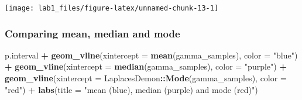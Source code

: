 \documentclass[]{article}
\newenvironment{Shaded}{\begin{snugshade}}{\end{snugshade}}
\newcommand{\KeywordTok}[1]{\textcolor[rgb]{0.13,0.29,0.53}{\textbf{#1}}}
\newcommand{\DataTypeTok}[1]{\textcolor[rgb]{0.13,0.29,0.53}{#1}}
\newcommand{\DecValTok}[1]{\textcolor[rgb]{0.00,0.00,0.81}{#1}}
\newcommand{\FloatTok}[1]{\textcolor[rgb]{0.00,0.00,0.81}{#1}}
\newcommand{\StringTok}[1]{\textcolor[rgb]{0.31,0.60,0.02}{#1}}
\newcommand{\OperatorTok}[1]{\textcolor[rgb]{0.81,0.36,0.00}{\textbf{#1}}}
\newcommand{\NormalTok}[1]{#1}
\begin{document}
\begin{Shaded}
\end{Shaded}

\begin{center}\texttt{[image: lab1\_files/figure-latex/unnamed-chunk-13-1]} \end{center}

\subsubsection{Comparing mean, median and
mode}\label{comparing-mean-median-and-mode}

\begin{Shaded}
\begin{Highlighting}[]
\NormalTok{p.interval }\OperatorTok{+}\StringTok{ }\KeywordTok{geom_vline}\NormalTok{(}\DataTypeTok{xintercept =} \KeywordTok{mean}\NormalTok{(gamma_samples), }\DataTypeTok{color =} \StringTok{"blue"}\NormalTok{) }\OperatorTok{+}\StringTok{ }
\StringTok{  }\KeywordTok{geom_vline}\NormalTok{(}\DataTypeTok{xintercept =} \KeywordTok{median}\NormalTok{(gamma_samples), }\DataTypeTok{color =} \StringTok{"purple"}\NormalTok{) }\OperatorTok{+}\StringTok{ }
\StringTok{  }\KeywordTok{geom_vline}\NormalTok{(}\DataTypeTok{xintercept =}\NormalTok{ LaplacesDemon}\OperatorTok{::}\KeywordTok{Mode}\NormalTok{(gamma_samples), }\DataTypeTok{color =} \StringTok{"red"}\NormalTok{) }\OperatorTok{+}
\StringTok{  }\KeywordTok{labs}\NormalTok{(}\DataTypeTok{title =} \StringTok{"mean (blue), median (purple) and mode (red)"}\NormalTok{)}
\end{Highlighting}
\end{Shaded}
\end{document}
